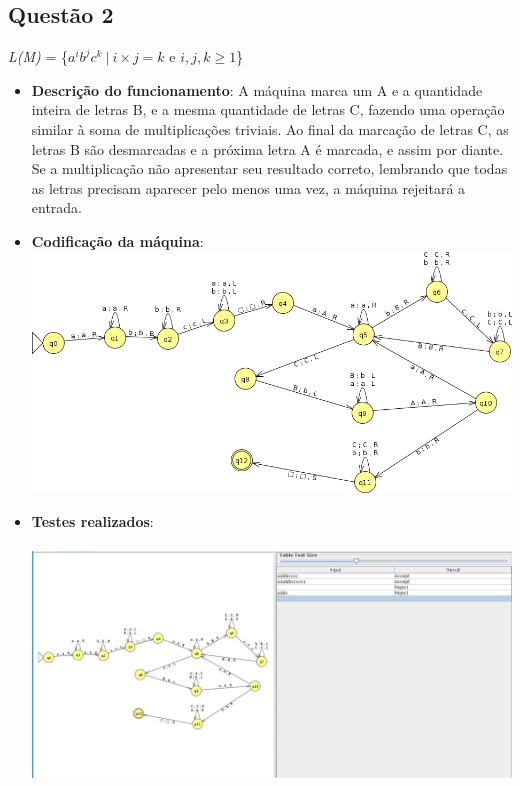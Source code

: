 \documentclass{article}
\begin{document}
\subsection*{Questão 2}
\textit{L(M)} = \{$a^{i}b^{j}c^{k}\ \vert\  i \times j = k $ e $i,j,k \geq 1$\}
\begin{itemize}
    \item \textbf{Descrição do funcionamento}: A máquina marca um A e a
    quantidade inteira de letras B, e a mesma quantidade de letras C, fazendo
    uma operação similar à soma de multiplicações triviais. Ao final da marcação
    de letras C, as letras B são desmarcadas e a próxima letra A é marcada, e
    assim por diante. Se a multiplicação não apresentar seu resultado correto,
    lembrando que todas as letras precisam aparecer pelo menos uma vez, a
    máquina rejeitará a entrada.
    \item \textbf{Codificação da máquina}: \\
    \includegraphics[scale=0.5]{questao2_ss.png}
	\item \textbf{Testes realizados}: \\ \\
    \includegraphics[width=\textwidth]{questao2_inputs.png}
\end{itemize}
\newpage
\end{document}
